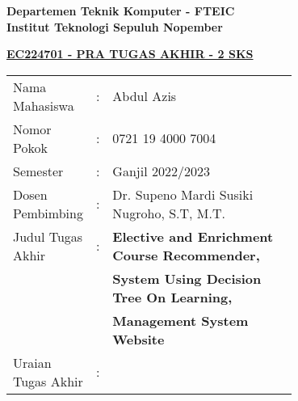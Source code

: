 \begin{flushleft}
  \textbf{Departemen Teknik Komputer - FTEIC}\\
  \textbf{Institut Teknologi Sepuluh Nopember}\\
\end{flushleft}

\begin{center}
  \underline{\textbf{EC224701 - PRA TUGAS AKHIR - 2 SKS}}
\end{center}

\begin{adjustwidth}{-0.2cm}{}
  \begin{tabular}{lcp{0.7\linewidth}}

    Nama Mahasiswa     & : & Abdul Azis                                            \\
    Nomor Pokok        & : & 0721 19 4000 7004                                     \\

    Semester           & : & Ganjil 2022/2023                                      \\

    Dosen Pembimbing   & : & Dr. Supeno Mardi Susiki Nugroho, S.T, M.T.            \\
    Judul Tugas Akhir  & : & \textbf{Elective and Enrichment Course Recommender, } \\
                       &   & \textbf{System Using Decision Tree On Learning,}      \\
                       &   & \textbf{Management System Website}                    \\

    Uraian Tugas Akhir & : &                                                       \\
  \end{tabular}
\end{adjustwidth}

